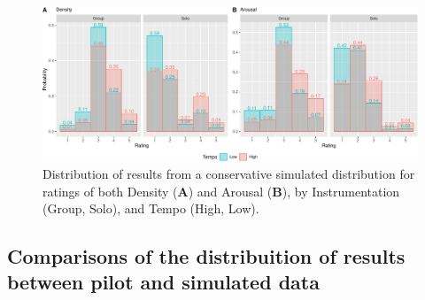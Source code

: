\documentclass[
  bookmarksnumbered]{article}
\begin{document}
\begin{figure}
\centering
\includegraphics{Power_analysis_files/figure-latex/final-sim-1.pdf}
\caption{\label{fig:final-sim}Distribution of results from a conservative simulated distribution for ratings of both Density (\textbf{A}) and Arousal (\textbf{B}), by Instrumentation (Group, Solo), and Tempo (High, Low).}
\end{figure}

\hypertarget{comparisons-of-the-distribuition-of-results-between-pilot-and-simulated-data}{%
\subsection{Comparisons of the distribuition of results between pilot and simulated data}\label{comparisons-of-the-distribuition-of-results-between-pilot-and-simulated-data}}
\end{document}
